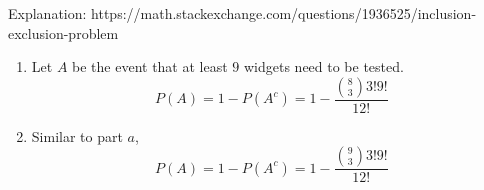 Explanation: https://math.stackexchange.com/questions/1936525/inclusion-exclusion-problem
\begin{enumerate}[label=(\alph*)]
\item Let $A$ be the event that at least $9$ widgets need to be tested. 
$$P(A) = 1 - P(A^{c}) = 1 - \frac{\binom{8}{3}3!9!}{12!}$$

\item Similar to part $a$, $$P(A) = 1 - P(A^{c}) = 1 - \frac{\binom{9}{3}3!9!}{12!}$$
\end{enumerate}
